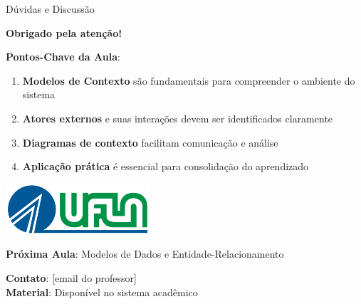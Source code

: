 \documentclass[aspectratio=169]{beamer}
\begin{document}
\begin{frame}{Dúvidas e Discussão}
\begin{center}
\textbf{Obrigado pela atenção!}
\end{center}

\textbf{Pontos-Chave da Aula}:
\begin{enumerate}
\item \textbf{Modelos de Contexto} são fundamentais para compreender o ambiente do sistema
\item \textbf{Atores externos} e suas interações devem ser identificados claramente
\item \textbf{Diagramas de contexto} facilitam comunicação e análise
\item \textbf{Aplicação prática} é essencial para consolidação do aprendizado
\end{enumerate}

\vspace{0.5cm}
\begin{center}
\includegraphics[width=0.4\textwidth]{../../Image/ufla-logo.PNG}
\end{center}

\vspace{0.3cm}
\textbf{Próxima Aula}: Modelos de Dados e Entidade-Relacionamento

\vspace{0.3cm}
\textbf{Contato}: [email do professor]\\
\textbf{Material}: Disponível no sistema acadêmico
\end{frame}
\end{document}
